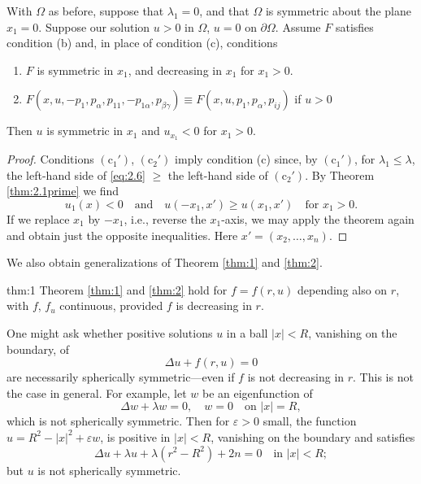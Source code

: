 \begin{corollary}\label{cor:1}
  With $\Omega$ as before, suppose that $\lambda_1=0$,
  and that $\Omega$ is symmetric about the plane $x_1=0$.
  Suppose our solution $u>0$ in $\Omega$, $u=0$ on $\partial\Omega$.
  Assume $F$ satisfies condition (b) and, in place of condition (c), conditions
  \begin{enumerate}[label = $(\mathrm{c}_{\arabic*}')$]
    \item $F$ is symmetric in $x_1$, and decreasing in $x_1$ for $x_1>0$.
    \item $F(x,u,-p_1,p_{\alpha},p_{11},-p_{1\alpha}, p_{\beta\gamma})
      \equiv F(x,u,p_1,p_\alpha,p_{ij})$ if $u>0$
  \end{enumerate}
  Then $u$ is symmetric in $x_1$ and $u_{x_1}<0$ for $x_1>0$.
\end{corollary}

\begin{proof}
  Conditions $(\mathrm{c}_1')$, $(\mathrm{c}_2')$ imply condition (c)
  since, by $(\mathrm{c}_1')$, for $\lambda_1\leq\lambda$,
  the left-hand side of \eqref{eq:2.6} $\geq$ the left-hand side of $(\mathrm{c}_2')$.
  By Theorem \ref{thm:2.1prime} we find
  \[u_1(x) < 0\quad \text{and} \quad u(-x_1, x') \geq u(x_1,x')
    \quad\text{for } x_1>0.\]
  If we replace $x_1$ by $-x_1$, i.e., reverse the $x_1$-axis,
  we may apply the theorem again and obtain just the opposite inequalities.
  Here $x' = (x_2,\ldots, x_n)$.
\end{proof}

 We also obtain generalizations of Theorem \ref{thm:1} and \ref{thm:2}.

\begin{theoremp}{thm:1}\label{thm:1prime}
  Theorem \ref{thm:1} and \ref{thm:2} hold for $f=f(r,u)$
  depending also on $r$, with $f$, $f_u$ continuous, provided $f$ is decreasing in $r$.
\end{theoremp}

One might ask whether positive solutions $u$ in a ball $|x|<R$,
vanishing on the boundary, of
\[\Delta u + f(r,u) = 0\]
are necessarily spherically symmetric---even if $f$ is not decreasing in $r$.
This is not the case in general. For example, let $w$ be an eigenfunction of
\[\Delta w + \lambda w = 0,\quad w = 0\quad \text{on } |x|=R,\]
which is not spherically symmetric. Then for $\varepsilon>0$ small, the function
$u = R^2 - |x|^2 + \varepsilon w$, is positive in $|x|<R$,
vanishing on the boundary and satisfies
\[\Delta u + \lambda u + \lambda(r^2-R^2) + 2n = 0\quad\text{in } |x|<R;\]
but $u$ is not spherically symmetric.


